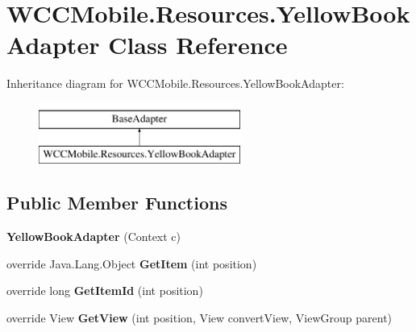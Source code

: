 \hypertarget{class_w_c_c_mobile_1_1_resources_1_1_yellow_book_adapter}{}\section{W\+C\+C\+Mobile.\+Resources.\+Yellow\+Book\+Adapter Class Reference}
\label{class_w_c_c_mobile_1_1_resources_1_1_yellow_book_adapter}
Inheritance diagram for W\+C\+C\+Mobile.\+Resources.\+Yellow\+Book\+Adapter\+:\begin{figure}[H]
\begin{center}
\leavevmode
\includegraphics[height=2.000000cm]{class_w_c_c_mobile_1_1_resources_1_1_yellow_book_adapter}
\end{center}
\end{figure}
\subsection*{Public Member Functions}
\begin{DoxyCompactItemize}
\item 
{\bfseries Yellow\+Book\+Adapter} (Context c)\hypertarget{class_w_c_c_mobile_1_1_resources_1_1_yellow_book_adapter_a5b67f8b8472369aba09dfb7784289256}{}\label{class_w_c_c_mobile_1_1_resources_1_1_yellow_book_adapter_a5b67f8b8472369aba09dfb7784289256}

\item 
override Java.\+Lang.\+Object {\bfseries Get\+Item} (int position)\hypertarget{class_w_c_c_mobile_1_1_resources_1_1_yellow_book_adapter_ad49d89254441016787d74c4300722d44}{}\label{class_w_c_c_mobile_1_1_resources_1_1_yellow_book_adapter_ad49d89254441016787d74c4300722d44}

\item 
override long {\bfseries Get\+Item\+Id} (int position)\hypertarget{class_w_c_c_mobile_1_1_resources_1_1_yellow_book_adapter_a9dfaeb0e011baf1c34a53dd32b0dc49a}{}\label{class_w_c_c_mobile_1_1_resources_1_1_yellow_book_adapter_a9dfaeb0e011baf1c34a53dd32b0dc49a}

\item 
override View {\bfseries Get\+View} (int position, View convert\+View, View\+Group parent)\hypertarget{class_w_c_c_mobile_1_1_resources_1_1_yellow_book_adapter_ad2054ed1b424cb960605d4b4f83df5d5}{}\label{class_w_c_c_mobile_1_1_resources_1_1_yellow_book_adapter_ad2054ed1b424cb960605d4b4f83df5d5}

\end{DoxyCompactItemize}
